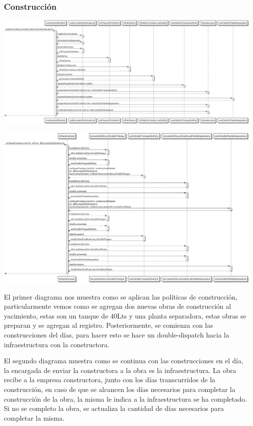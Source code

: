 \documentclass[10pt,a4paper]{article}
\begin{document}
\subsubsection{Construcción}
\centerline{\includegraphics[scale=0.325]{images/secuenciaConstruir.png}}
\vspace{0.25cm}
\centerline{\includegraphics[scale=0.325]{images/secuenciaConstruirInfraestructura.png}}

El primer diagrama nos muestra como se aplican las políticas de construcción, particularmente vemos como se agregan dos nuevas obras de construcción al yacimiento, estas son un tanque de 40Lts y una planta separadora, estas obras se preparan y se agregan al registro. Posteriormente, se comienza con las construcciones del días, para hacer esto se hace un double-dispatch hacia la infraestructura con la constructora.

El segundo diagrama muestra como se continua con las construcciones en el día, la encargada de enviar la constructora a la obra es la infraestructura. La obra recibe a la empresa constructora, junto con los días transcurridos de la construcción, en caso de que se alcancen los días necesarios para completar la construcción de la obra, la misma le indica a la infraestructura se ha completado. Si no se completo la obra, se actualiza la cantidad de días necesarios para completar la misma.
\end{document}
